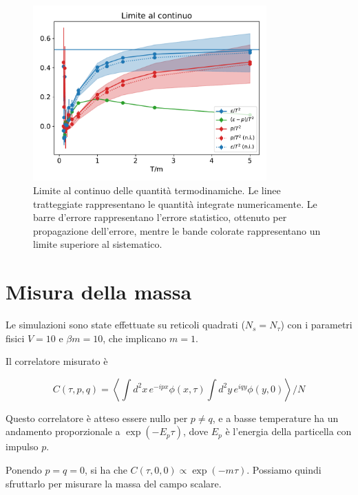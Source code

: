 \documentclass[a4paper,11pt]{article}
\newcommand{\avg}[1]{\left\langle {#1} \right\rangle}
\begin{document}
    \begin{figure}[htb]
        \centering
        \includegraphics[width=0.8\textwidth]{figures/continuum.pdf}
        \caption{Limite al continuo delle quantità termodinamiche. Le linee tratteggiate rappresentano le quantità integrate numericamente. Le barre d'errore rappresentano l'errore statistico, ottenuto per propagazione dell'errore, mentre le bande colorate rappresentano un limite superiore al sistematico.}
        \label{fig:thermo_continuum}
    \end{figure}

    

    
    \section{Misura della massa}
   
    Le simulazioni sono state effettuate su reticoli quadrati ($N_s = N_\tau$) con i parametri fisici $V = 10$ e $\beta m = 10$, che implicano $m = 1$. 
    
    Il correlatore misurato è
    
    \begin{equation}
        C(\tau, p, q) = \avg{\int d^2 x \, e^{-ipx} \phi(x,\tau) \int d^2 y \, e^{iqy} \phi(y, 0)} / N
    \end{equation}
    
    Questo correlatore è atteso essere nullo per $p \neq q$, e a basse temperature ha un andamento proporzionale a $\exp (- E_p \tau)$, dove $E_p$ è l'energia della particella con impulso $p$.
    
    Ponendo $p = q = 0$, si ha che $C(\tau, 0, 0) \propto \exp (-m\tau)$. Possiamo quindi sfruttarlo per misurare la massa del campo scalare.
    
\end{document}
